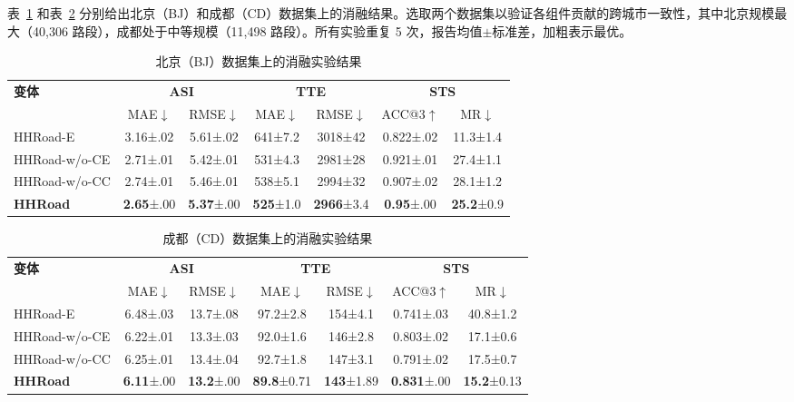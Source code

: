 表~\ref{tab:ablation_bj} 和表~\ref{tab:ablation_cd} 分别给出北京（BJ）和成都（CD）数据集上的消融结果。选取两个数据集以验证各组件贡献的跨城市一致性，其中北京规模最大（40,306 路段），成都处于中等规模（11,498 路段）。所有实验重复 5 次，报告均值$\pm$标准差，加粗表示最优。

\begin{table}[H]
    \centering
    \caption{北京（BJ）数据集上的消融实验结果}
    \label{tab:ablation_bj}
    \setlength{\tabcolsep}{4pt}
    \begin{tabular}{l|cc|cc|cc}
        \hline
        \textbf{变体} & \multicolumn{2}{c|}{\textbf{ASI}} & \multicolumn{2}{c|}{\textbf{TTE}} & \multicolumn{2}{c}{\textbf{STS}} \\
        & MAE$\downarrow$ & RMSE$\downarrow$ & MAE$\downarrow$ & RMSE$\downarrow$ & ACC@3$\uparrow$ & MR$\downarrow$ \\
        \hline
        HHRoad-E         & 3.16\tiny{±.02} & 5.61\tiny{±.02} & 641\tiny{±7.2} & 3018\tiny{±42} & 0.822\tiny{±.02} & 11.3\tiny{±1.4} \\
        HHRoad-w/o-CE    & 2.71\tiny{±.01} & 5.42\tiny{±.01} & 531\tiny{±4.3} & 2981\tiny{±28} & 0.921\tiny{±.01} & 27.4\tiny{±1.1} \\
        HHRoad-w/o-CC    & 2.74\tiny{±.01} & 5.46\tiny{±.01} & 538\tiny{±5.1} & 2994\tiny{±32} & 0.907\tiny{±.02} & 28.1\tiny{±1.2} \\
        \textbf{HHRoad}  & \textbf{2.65}\tiny{±.00} & \textbf{5.37}\tiny{±.00} & \textbf{525}\tiny{±1.0} & \textbf{2966}\tiny{±3.4} & \textbf{0.95}\tiny{±.00} & \textbf{25.2}\tiny{±0.9} \\
        \hline
    \end{tabular}
\end{table}

\begin{table}[H]
    \centering
    \caption{成都（CD）数据集上的消融实验结果}
    \label{tab:ablation_cd}
    \setlength{\tabcolsep}{4pt}
    \begin{tabular}{l|cc|cc|cc}
        \hline
        \textbf{变体} & \multicolumn{2}{c|}{\textbf{ASI}} & \multicolumn{2}{c|}{\textbf{TTE}} & \multicolumn{2}{c}{\textbf{STS}} \\
        & MAE$\downarrow$ & RMSE$\downarrow$ & MAE$\downarrow$ & RMSE$\downarrow$ & ACC@3$\uparrow$ & MR$\downarrow$ \\
        \hline
        HHRoad-E         & 6.48\tiny{±.03} & 13.7\tiny{±.08} & 97.2\tiny{±2.8} & 154\tiny{±4.1}  & 0.741\tiny{±.03} & 40.8\tiny{±1.2} \\
        HHRoad-w/o-CE    & 6.22\tiny{±.01} & 13.3\tiny{±.03} & 92.0\tiny{±1.6} & 146\tiny{±2.8}  & 0.803\tiny{±.02} & 17.1\tiny{±0.6} \\
        HHRoad-w/o-CC    & 6.25\tiny{±.01} & 13.4\tiny{±.04} & 92.7\tiny{±1.8} & 147\tiny{±3.1}  & 0.791\tiny{±.02} & 17.5\tiny{±0.7} \\
        \textbf{HHRoad}  & \textbf{6.11}\tiny{±.00} & \textbf{13.2}\tiny{±.00} & \textbf{89.8}\tiny{±0.71} & \textbf{143}\tiny{±1.89} & \textbf{0.831}\tiny{±.00} & \textbf{15.2}\tiny{±0.13} \\
        \hline
    \end{tabular}
\end{table}

